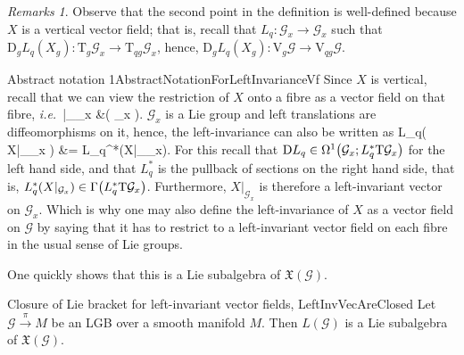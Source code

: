 \documentclass[a4paper,oneside,11pt,bibliography=totoc]{scrartcl}
\def\ba#1\ea{\begin{align}#1\end{align}}
\def\bas#1\eas{\begin{align*}#1\end{align*}}
\theoremstyle{plain}
\theoremstyle{remark}
\newtheorem{remark}[theorem]{Remarks}
\theoremstyle{definition}
\begin{document}
\begin{remark}
\leavevmode\newline
Observe that the second point in the definition is well-defined because $X$ is a vertical vector field; that is, recall that $L_q: \mathcal{G}_x \to \mathcal{G}_x$ such that $\mathrm{D}_gL_q(X_g): \mathrm{T}_g\mathcal{G}_x \to \mathrm{T}_{qg}\mathcal{G}_x$, hence, $\mathrm{D}_gL_q(X_g): \mathrm{V}_g\mathcal{G} \to \mathrm{V}_{qg}\mathcal{G}$.
\end{remark}

\begin{remarks}{Abstract notation 1}{AbstractNotationForLeftInvarianceVf}
Since $X$ is vertical, recall that we can view the restriction of $X$ onto a fibre as a vector field on that fibre, \textit{i.e.}\
\bas
X|_{_x} &\in {}\mleft( _x \mright).
\eas
$\mathcal{G}_x$ is a Lie group and left translations are diffeomorphisms on it, hence, the left-invariance can also be written as
\ba
\mathrm{D}L_q\mleft( X|_{_x} \mright) &= L_q^*\mleft(X|_{_x}\mright).
\ea
For this recall that $\mathrm{D}L_q \in \Omega^1\mleft(\mathcal{G}_x; L_q^*\mathrm{T}\mathcal{G}_x\mright)$ for the left hand side, and that $L_q^*$ is the pullback of sections on the right hand side, that is, $L_q^*\mleft(X|_{\mathcal{G}_x}\mright) \in \Gamma\mleft(L_q^*\mathrm{T}\mathcal{G}_x\mright)$.
Furthermore, $X|_{\mathcal{G}_x}$ is therefore a left-invariant vector on $\mathcal{G}_x$. Which is why one may also define the left-invariance of $X$ as a vector field on $\mathcal{G}$ by saying that it has to restrict to a left-invariant vector field on each fibre in the usual sense of Lie groups.
\end{remarks}

One quickly shows that this is a Lie subalgebra of $\mathfrak{X}(\mathcal{G})$.

\begin{lemmata}{Closure of Lie bracket for left-invariant vector fields, \newline \cite[\S 3.5, special situation of Lemma 3.5.5, page 122]{mackenzieGeneralTheory}}{LeftInvVecAreClosed}
Let $\mathcal{G} \stackrel{\pi}{\to} M$ be an LGB over a smooth manifold $M$. Then $L(\mathcal{G})$ is a Lie subalgebra of $\mathfrak{X}(\mathcal{G})$.
\end{lemmata}
\end{document}
